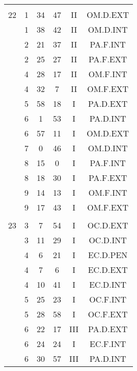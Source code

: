 \documentclass[12pt, a4paper]{article}
\begin{document}
\begin{multicols}{3}
{\begin{tabular}{c c c c c c}
	 	 	 	 & & & & & \\%
	 	 	 	22 & 1 & 34 & 47 & II & OM.D.EXT\\%
	 	 	 	 & 1 & 38 & 42 & II & OM.D.INT\\%
	 	 	 	 & 2 & 21 & 37 & II & PA.F.INT\\%
	 	 	 	 & 2 & 25 & 27 & II & PA.F.EXT\\%
	 	 	 	 & 4 & 28 & 17 & II & OM.F.INT\\%
	 	 	 	 & 4 & 32 & 7 & II & OM.F.EXT\\%
	 	 	 	 & 5 & 58 & 18 & I & PA.D.EXT\\%
	 	 	 	 & 6 & 1 & 53 & I & PA.D.INT\\%
	 	 	 	 & 6 & 57 & 11 & I & OM.D.EXT\\%
	 	 	 	 & 7 & 0 & 46 & I & OM.D.INT\\%
	 	 	 	 & 8 & 15 & 0 & I & PA.F.INT\\%
	 	 	 	 & 8 & 18 & 30 & I & PA.F.EXT\\%
	 	 	 	 & 9 & 14 & 13 & I & OM.F.INT\\%
	 	 	 	 & 9 & 17 & 43 & I & OM.F.EXT\\%
	 	 	 	 & & & & & \\%
	 	 	 	23 & 3 & 7 & 54 & I & OC.D.EXT\\%
	 	 	 	 & 3 & 11 & 29 & I & OC.D.INT\\%
	 	 	 	 & 4 & 6 & 21 & I & EC.D.PEN\\%
	 	 	 	 & 4 & 7 & 6 & I & EC.D.EXT\\%
	 	 	 	 & 4 & 10 & 41 & I & EC.D.INT\\%
	 	 	 	 & 5 & 25 & 23 & I & OC.F.INT\\%
	 	 	 	 & 5 & 28 & 58 & I & OC.F.EXT\\%
	 	 	 	 & 6 & 22 & 17 & III & PA.D.EXT\\%
	 	 	 	 & 6 & 24 & 24 & I & EC.F.INT\\%
	 	 	 	 & 6 & 30 & 57 & III & PA.D.INT\\%
	 	 \end{tabular}
 	}
\end{multicols}
\end{document}
